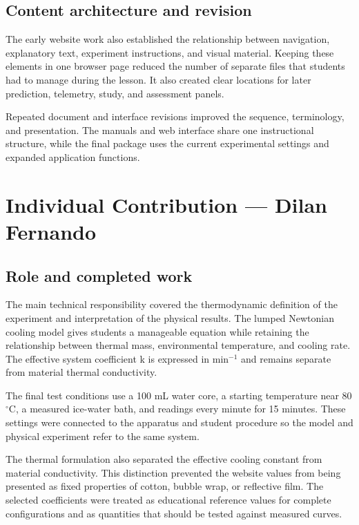 \documentclass[10pt,conference,a4paper]{IEEEtran}
\begin{document}
\subsection*{Content architecture and revision}

The early website work also established the relationship between navigation, explanatory text, experiment instructions, and visual material. Keeping these elements in one browser page reduced the number of separate files that students had to manage during the lesson. It also created clear locations for later prediction, telemetry, study, and assessment panels.

Repeated document and interface revisions improved the sequence, terminology, and presentation. The manuals and web interface share one instructional structure, while the final package uses the current experimental settings and expanded application functions.

\endgroup

\begingroup\normalsize\setlength{\parskip}{2pt}

\section*{Individual Contribution --- Dilan Fernando}

\subsection*{Role and completed work}

The main technical responsibility covered the thermodynamic definition of the experiment and interpretation of the physical results. The lumped Newtonian cooling model gives students a manageable equation while retaining the relationship between thermal mass, environmental temperature, and cooling rate. The effective system coefficient k is expressed in min$^{-1}$ and remains separate from material thermal conductivity.

The final test conditions use a 100 mL water core, a starting temperature near 80 $^\circ$C, a measured ice-water bath, and readings every minute for 15 minutes. These settings were connected to the apparatus and student procedure so the model and physical experiment refer to the same system.

The thermal formulation also separated the effective cooling constant from material conductivity. This distinction prevented the website values from being presented as fixed properties of cotton, bubble wrap, or reflective film. The selected coefficients were treated as educational reference values for complete configurations and as quantities that should be tested against measured curves.
\end{document}
